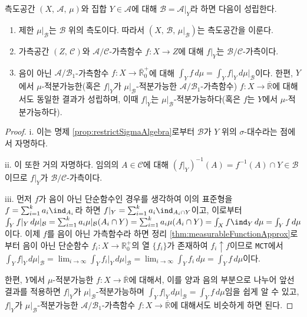 \begin{theorem}\label{thm:intRistriction}
    측도공간 $(X,\,\mathcal{A},\,\mu)$와 집합 $Y\in\mathcal{A}$에 대해 $\mathcal{B}=\mathcal{A}\vert_Y$라 하면 다음이 성립한다.
    \begin{enumerate}
        \item 제한 $\mu\vert_\mathcal{B}$는 $\mathcal{B}$ 위의 측도이다. 따라서 $(X,\,\mathcal{B},\,\mu\vert_\mathcal{B})$는 측도공간을 이룬다.
        \item 가측공간 $(Z,\,\mathcal{C})$와 $\mathcal{A}/\mathcal{C}$-가측함수 $f:X\to Z$에 대해 $f\vert_Y$는 $\mathcal{B}/\mathcal{C}$-가측이다.
        \item 음이 아닌 $\mathcal{A}/\mathcal{B}_1$-가측함수 $f:X\to\overline{\mathbb{R}}^+_0$에 대해 $\int_Yf\,d\mu=\int_Yf\vert_Y\,d\mu\vert_{\mathcal{B}}$이다. 한편, $Y$에서 $\mu$-적분가능한(혹은 $f\vert_Y$가 $\mu\vert_\mathcal{B}$-적분가능한 $\mathcal{A}/\mathcal{B}_1$-가측함수) $f:X\to\overline{\mathbb{R}}$에 대해서도 동일한 결과가 성립하며, 이때 $f\vert_Y$는 $\mu\vert_\mathcal{B}$-적분가능하다(혹은 $f$는 $Y$에서 $\mu$-적분가능하다).
    \end{enumerate}
\end{theorem}

\begin{proof}
    i. 이는 명제 \ref{prop:restrictSigmaAlgebra}로부터 $\mathcal{B}$가 $Y$ 위의 $\sigma$-대수라는 점에서 자명하다.

    ii. 이 또한 거의 자명하다. 임의의 $A\in\mathcal{C}$에 대해 $(f\vert_Y)^{-1}(A)=f^{-1}(A)\cap Y\in\mathcal{B}$이므로 $f\vert_Y$가 $\mathcal{B}/\mathcal{C}$-가측이다.
    
    iii. 먼저 $f$가 음이 아닌 단순함수인 경우를 생각하여 이의 표준형을 $f=\sum_{i=1}^ka_i\ind_{A_i}$라 하면 $f\vert_Y=\sum_{i=1}^ka_i\ind_{A_i\cap Y}$이고, 이로부터 $\int_Yf\vert_Y\,d\mu\vert_\mathcal{B}=\sum_{i=1}^ka_i\mu\vert_\mathcal{B}(A_i\cap Y)=\sum_{i=1}^ka_i\mu(A_i\cap Y)=\int_Xf\ind_Y\,d\mu=\int_Yf\,d\mu$이다. 이제 $f$를 음이 아닌 가측함수라 하면 정리 \ref{thm:measurableFunctionApprox}로부터 음이 아닌 단순함수 $f_i:X\to\mathbb{R}^+_0$의 열 $\{f_i\}$가 존재하여 $f_i\uparrow f$이므로 \texttt{MCT}에서 $\int_Yf\vert_Y\,d\mu\vert_\mathcal{B}=\lim_{i\to\infty}\int_Yf_i\vert_Y\,d\mu\vert_\mathcal{B}=\lim_{i\to\infty}\int_Yf_i\,d\mu=\int_Yf\,d\mu$이다.

    한편, $Y$에서 $\mu$-적분가능한 $f:X\to\overline{\mathbb{R}}$에 대해서, 이를 양과 음의 부분으로 나누어 앞선 결과를 적용하면 $f\vert_Y$가 $\mu\vert_\mathcal{B}$-적분가능하며 $\int_Yf\vert_Y\,d\mu\vert_{\mathcal{B}}=\int_Yf\,d\mu$임을 쉽게 알 수 있고, $f\vert_Y$가 $\mu\vert_\mathcal{B}$-적분가능한 $\mathcal{A}/\mathcal{B}_1$-가측함수 $f:X\to\overline{\mathbb{R}}$에 대해서도 비슷하게 하면 된다.
\end{proof}

